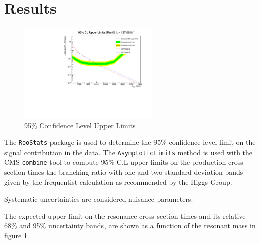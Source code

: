 \section{Results}

\begin{figure}[tph]
  \centering
  \includegraphics[width=0.6\textwidth]{fig/Run2/Run2_ExclusionLimits.pdf}
  \caption{95\% Confidence Level Upper Limits}
  \label{fig:BrazilianPlot}
\end{figure}

The \verb|RooStats| package is used to determine the 95\% confidence-level limit
on the signal contribution in the data. The \verb|AsymptoticLimits| method is
used with the CMS \verb|combine| tool to compute 95\% C.L upper-limits on the
production cross section times the branching ratio with one and two standard
deviation bands given by the frequentist calculation as recommended by the
Higgs Group.

Systematic uncertainties are considered nuisance parameters.

The expected upper limit on the resonance cross section times and its relative
68\% and 95\% uncertainty bands, are shown as a function of the resonant mass
in figure \ref{fig:BrazilianPlot}



